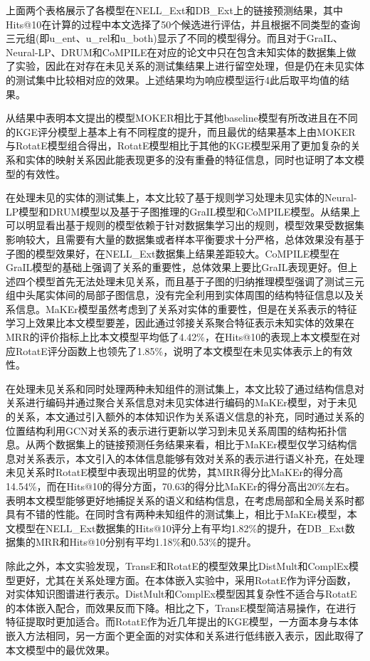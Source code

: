 上面两个表格展示了各模型在NELL\_Ext和DB\_Ext上的链接预测结果，其中Hits@10在计算的过程中本文选择了50个候选进行评估，并且根据不同类型的查询三元组(即u\_ent、u\_rel和u\_both)显示了不同的模型得分。而且对于GraIL、Neural-LP、DRUM和CoMPILE在对应的论文中只在包含未知实体的数据集上做了实验，因此在对存在未见关系的测试集结果上进行留空处理，但是仍在未见实体的测试集中比较相对应的效果。上述结果均为响应模型运行4此后取平均值的结果。

从结果中表明本文提出的模型MOKER相比于其他baseline模型有所改进且在不同的KGE评分模型上基本上有不同程度的提升，而且最优的结果基本上由MOKER与RotatE模型组合得出，RotatE模型相比于其他的KGE模型采用了更加复杂的关系和实体的映射关系因此能表现更多的没有重叠的特征信息，同时也证明了本文模型的有效性。

在处理未见的实体的测试集上，本文比较了基于规则学习处理未见实体的Neural-LP模型和DRUM模型以及基于子图推理的GraIL模型和CoMPILE模型。从结果上可以明显看出基于规则的模型依赖于针对数据集学习出的规则，模型效果受数据集影响较大，且需要有大量的数据集或者样本平衡要求十分严格，总体效果没有基于子图的模型效果好，在NELL\_Ext数据集上结果差距较大。CoMPILE模型在GraIL模型的基础上强调了关系的重要性，总体效果上要比GraIL表现更好。但上述四个模型首先无法处理未见关系，而且基于子图的归纳推理模型强调了测试三元组中头尾实体间的局部子图信息，没有完全利用到实体周围的结构特征信息以及关系信息。MaKEr模型虽然考虑到了关系对实体的重要性，但是在关系表示的特征学习上效果比本文模型要差，因此通过邻接关系聚合特征表示未知实体的效果在MRR的评价指标上比本文模型平均低了4.42\%，在Hits@10的表现上本文模型在对应RotatE评分函数上也领先了1.85\%，说明了本文模型在未见实体表示上的有效性。

在处理未见关系和同时处理两种未知组件的测试集上，本文比较了通过结构信息对关系进行编码并通过聚合关系信息对未见实体进行编码的MaKEr模型，对于未见的关系，本文通过引入额外的本体知识作为关系语义信息的补充，同时通过关系的位置结构利用GCN对关系的表示进行更新以学习到未见关系周围的结构拓扑信息。从两个数据集上的链接预测任务结果来看，相比于MaKEr模型仅学习结构信息对关系表示，本文引入的本体信息能够有效对关系的表示进行语义补充，在处理未见关系时RotatE模型中表现出明显的优势，其MRR得分比MaKEr的得分高14.54\%，而在Hits@10的得分方面，70.63的得分比MaKEr的得分高出20\%左右。表明本文模型能够更好地捕捉关系的语义和结构信息，在考虑局部和全局关系时都具有不错的性能。在同时含有两种未知组件的测试集上，相比于MaKEr模型，本文模型在NELL\_Ext数据集的Hits@10评分上有平均1.82\%的提升，在DB\_Ext数据集的MRR和Hits@10分别有平均1.18\%和0.53\%的提升。

除此之外，本文实验发现，TransE和RotatE的模型效果比DistMult和ComplEx模型更好，尤其在关系处理方面。在本体嵌入实验中，采用RotatE作为评分函数，对实体知识图谱进行表示。DistMult和ComplEx模型因其复杂性不适合与RotatE的本体嵌入配合，而效果反而下降。相比之下，TransE模型简洁易操作，在进行特征提取时更加适合。而RotatE作为近几年提出的KGE模型，一方面本身与本体嵌入方法相同，另一方面个更全面的对实体和关系进行低纬嵌入表示，因此取得了本文模型中的最优效果。

